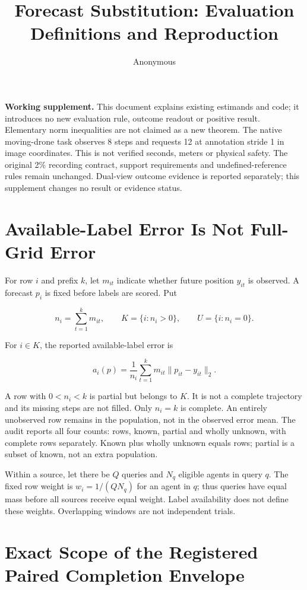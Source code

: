 \documentclass[10pt,twocolumn,letterpaper]{article}
\title{Forecast Substitution: Evaluation Definitions and Reproduction}\author{Anonymous}
\begin{document}
\raggedbottom\maketitle
\textbf{Working supplement.} This document explains existing estimands and code; it introduces no new evaluation rule, outcome readout or positive result. Elementary norm inequalities are not claimed as a new theorem. The native moving-drone task observes 8 steps and requests 12 at annotation stride 1 in image coordinates. This is not verified seconds, meters or physical safety. The original 2\% recording contract, support requirements and undefined-reference rules remain unchanged. Dual-view outcome evidence is reported separately; this supplement changes no result or evidence status.


\section{Available-Label Error Is Not Full-Grid Error}

For row $i$ and prefix $k$, let $m_{it}$ indicate whether future position $y_{it}$ is observed. A forecast $p_i$ is fixed before labels are scored. Put


\[
n_i=\sum_{t=1}^{k}m_{it},\qquad
K=\{i:n_i>0\},\qquad U=\{i:n_i=0\}.
\]

For $i\in K$, the reported available-label error is


\[
a_i(p)=\frac{1}{n_i}\sum_{t=1}^{k}m_{it}\lVert p_{it}-y_{it}\rVert_2.
\]

A row with $0<n_i<k$ is partial but belongs to $K$. It is not a complete trajectory and its missing steps are not filled. Only $n_i=k$ is complete. An entirely unobserved row remains in the population, not in the observed error mean. The audit reports all four counts: rows, known, partial and wholly unknown, with complete rows separately. Known plus wholly unknown equals rows; partial is a subset of known, not an extra population.


Within a source, let there be $Q$ queries and $N_q$ eligible agents in query $q$. The fixed row weight is $w_i=1/(QN_q)$ for an agent in $q$; thus queries have equal mass before all sources receive equal weight. Label availability does not define these weights. Overlapping windows are not independent trials.


\section{Exact Scope of the Registered Paired Completion Envelope}
\end{document}
